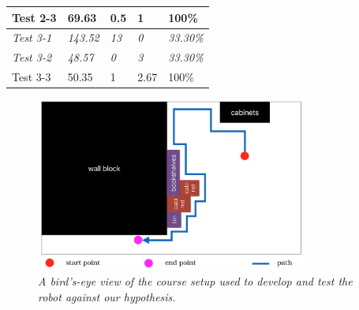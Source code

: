 \documentclass[a4paper,12pt]{article}
\begin{document}
{{{{\begin{tabular}{|m{}|m{}|m{}|m{}|m{}|}
        Test 2-3 & 69.63 & 0.5 & 1 & 100\%
        \\ \hline

        \textit{Test 3-1} & \textit{143.52} & \textit{13} & \textit{0} & \textit{33.30\%}
        \\ \hline

        \textit{Test 3-2} & \textit{48.57} & \textit{0} & \textit{3} & \textit{33.30\%}
        \\ \hline
          
        Test 3-3 & 50.35 & 1 & 2.67 & 100\%
        \\ \hline

    \end{tabular}
\label{tab:exp-info}
}

\vspace{10mm}

\begin{figure}[h]
    \centering
    \includegraphics[width=0.8\textwidth]{path}
    \caption{\textit{A bird's-eye view of the course setup used to develop and test the robot against our hypothesis.}}
    \label{fig:course}
\end{figure}

}}}
\end{document}
